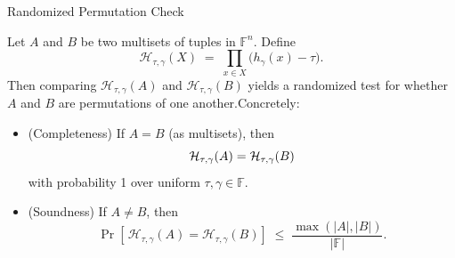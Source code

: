 \documentclass{zkdl-presentation-template}
\begin{document}
    \begin{frame}{Randomized Permutation Check}
        \begin{definition}
            Let $A$ and $B$ be two multisets of tuples in $\mathbb{F}^n$. Define
            \begin{equation*}
                \mathcal{H}_{\tau,\gamma}(X)\;=\;\prod_{x \in X}\bigl(h_{\gamma}(x)-\tau\bigr).
            \end{equation*}
            \pause
            Then comparing $\mathcal{H}_{\tau,\gamma}(A)$ and $\mathcal{H}_{\tau,\gamma}(B)$ yields a
            randomized test for whether $A$ and $B$ are permutations of one another.\pause Concretely:
            \begin{itemize}
                \item (Completeness) If $A=B$ (as multisets), then  
                    \vspace{-5px}
                    \begin{equation*}
                        \mathcal{H}_{\tau,\gamma}(A)=\mathcal{H}_{\tau,\gamma}(B)
                        \vspace{-5px}
                    \end{equation*}
                    with probability 1 over uniform $\tau,\gamma\in\mathbb{F}$.
                \item (Soundness) If $A\neq B$, then
                    \vspace{-5px}
                    \begin{equation*}
                        \Pr\left[\,\mathcal{H}_{\tau,\gamma}(A)=\mathcal{H}_{\tau,\gamma}(B)\right]\;\le\; \frac{\max(|A|,|B|)}{|\mathbb{F}|}.
                    \end{equation*}
            \end{itemize}
        \end{definition}
    \end{frame}
\end{document}
